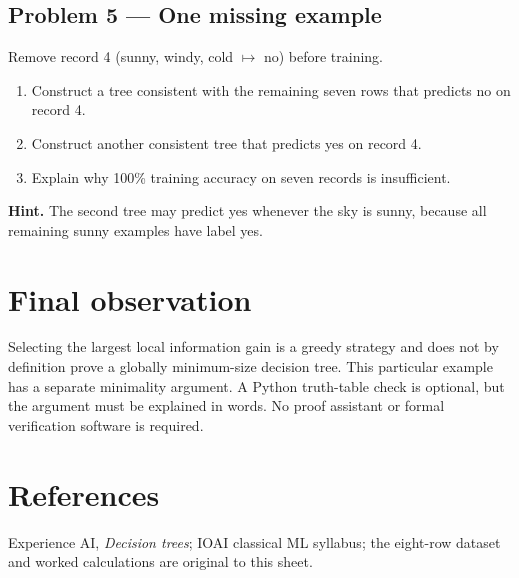 \documentclass[11pt,a4paper]{article}
\newcommand{\problem}[1]{\subsection*{Problem #1}}
\begin{document}
\problem{5 --- One missing example}
Remove record 4 (sunny, windy, cold $\mapsto$ no) before training.
\begin{enumerate}[label=(\alph*)]
\item Construct a tree consistent with the remaining seven rows that predicts no on record 4.
\item Construct another consistent tree that predicts yes on record 4.
\item Explain why 100\% training accuracy on seven records is insufficient.
\end{enumerate}
\textbf{Hint.} The second tree may predict yes whenever the sky is sunny, because all remaining sunny examples have label yes.

\section*{Final observation}
Selecting the largest local information gain is a greedy strategy and does not by definition prove a globally minimum-size decision tree. This particular example has a separate minimality argument. A Python truth-table check is optional, but the argument must be explained in words. No proof assistant or formal verification software is required.

\section*{References}
Experience AI, \emph{Decision trees}; IOAI classical ML syllabus; the eight-row dataset and worked calculations are original to this sheet.
\end{document}
